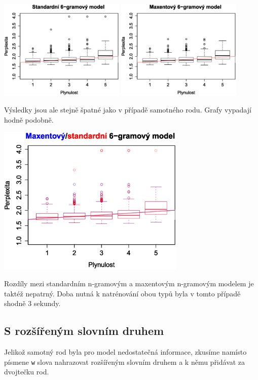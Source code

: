 \documentclass[12pt,a4paper]{report}
\begin{document}
\begin{center}
	\includegraphics[width=60mm]{./grafy/morf/ngram/rodstejny.eps}
	\includegraphics[width=60mm]{./grafy/morf/maxent/rodstejny.eps}
\end{center}
Výsledky jsou ale stejně špatné jako v případě samotného rodu. Grafy vypadají hodně podobně.
\begin{center}
	\includegraphics[width=90mm]{./grafy/morf/porovnani/rodstejny.eps}	
\end{center}
Rozdíly mezi standardním n-gramovým a maxentovým n-gramovým modelem je taktéž nepatrný. Doba nutná k natrénování obou typů byla v tomto případě shodně 3 sekundy.

\subsection{S rozšířeným slovním druhem}
Jelikož samotný rod byla pro model nedostatečná informace, zkusíme namísto písmene \texttt{w} slova nahrazovat rozšířeným slovním druhem a k němu přidávat za dvojtečku rod.
\end{document}
